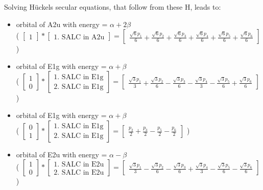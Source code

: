 \documentclass[12pt,a4paper]{article}
\begin{document}
Solving Hückels secular equations, that follow from these H, leads to:
\begin{itemize}
\item orbital of A2u with energy = $\alpha + 2 \beta$ \\
                            ( $\left[\begin{matrix}1\end{matrix}\right] * \left[\begin{array}{c}\text{1. SALC in A2u}\end{array}\right] = \left[\begin{matrix}\frac{\sqrt{6} p_{1}}{6} + \frac{\sqrt{6} p_{2}}{6} + \frac{\sqrt{6} p_{3}}{6} + \frac{\sqrt{6} p_{4}}{6} + \frac{\sqrt{6} p_{5}}{6} + \frac{\sqrt{6} p_{6}}{6}\end{matrix}\right] $ )
\item orbital of E1g with energy = $\alpha + \beta$ \\
                            ( $\left[\begin{matrix}1\\0\end{matrix}\right] * \left[\begin{array}{c}\text{1. SALC in E1g} \\ \text{2. SALC in E1g}\end{array}\right] = \left[\begin{matrix}\frac{\sqrt{3} p_{1}}{3} + \frac{\sqrt{3} p_{2}}{6} - \frac{\sqrt{3} p_{3}}{6} - \frac{\sqrt{3} p_{4}}{3} - \frac{\sqrt{3} p_{5}}{6} + \frac{\sqrt{3} p_{6}}{6}\end{matrix}\right] $ )
\item orbital of E1g with energy = $\alpha + \beta$ \\
                            ( $\left[\begin{matrix}0\\1\end{matrix}\right] * \left[\begin{array}{c}\text{1. SALC in E1g} \\ \text{2. SALC in E1g}\end{array}\right] = \left[\begin{matrix}\frac{p_{2}}{2} + \frac{p_{3}}{2} - \frac{p_{5}}{2} - \frac{p_{6}}{2}\end{matrix}\right] $ )
\item orbital of E2u with energy = $\alpha - \beta$ \\
                            ( $\left[\begin{matrix}1\\0\end{matrix}\right] * \left[\begin{array}{c}\text{1. SALC in E2u} \\ \text{2. SALC in E2u}\end{array}\right] = \left[\begin{matrix}\frac{\sqrt{3} p_{1}}{3} - \frac{\sqrt{3} p_{2}}{6} - \frac{\sqrt{3} p_{3}}{6} + \frac{\sqrt{3} p_{4}}{3} - \frac{\sqrt{3} p_{5}}{6} - \frac{\sqrt{3} p_{6}}{6}\end{matrix}\right] $ )

\end{itemize}
\end{document}

